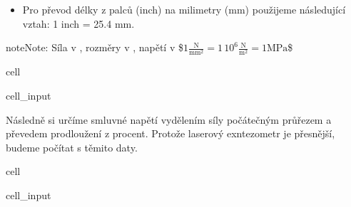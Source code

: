 \documentclass[letterpaper,10pt,english]{jupyterBook}
\begin{document}
{{\begin{itemize}
\item {} 
\sphinxAtStartPar
Pro převod délky z palců (inch) na milimetry (mm) použijeme následující vztah:
1 inch = 25.4 mm.

\end{itemize}

\begin{sphinxadmonition}{note}{Note:}
\sphinxAtStartPar
Síla v , rozměry v , napětí v 
\$\(1 \frac{\mathrm{N}}{\mathrm{mm}^2} =   1\,10^6 \frac{\mathrm{N}}{\mathrm{m}^2} = 1 \mathrm{MPa}\)\$
\end{sphinxadmonition}

\begin{sphinxuseclass}{cell}\begin{sphinxVerbatimInput}

\begin{sphinxuseclass}{cell_input}
\begin{sphinxVerbatim}[commandchars=\\\{\}]
     
  \PYG{p}{[}\PYG{p}{]}   
  \PYG{p}{[}\PYG{p}{]}   
\end{sphinxVerbatim}

\end{sphinxuseclass}\end{sphinxVerbatimInput}

\end{sphinxuseclass}
\sphinxAtStartPar
Následně si určíme smluvné napětí vydělením síly počátečným průřezem a převedem prodloužení z procent. Protože laserový exntezometr je přesnější, budeme počítat s těmito daty.

\begin{sphinxuseclass}{cell}\begin{sphinxVerbatimInput}

\begin{sphinxuseclass}{cell_input}
\begin{sphinxVerbatim}[commandchars=\\\{\}]
  
    
  


\end{sphinxVerbatim}
\end{sphinxuseclass}
\end{sphinxVerbatimInput}
\end{sphinxuseclass}}}
\end{document}
